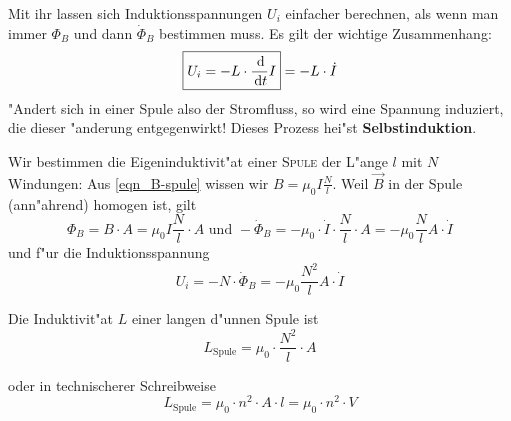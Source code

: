 Mit ihr lassen sich Induktionsspannungen $U_i$ einfacher berechnen,
als wenn man immer $\Phi_B$ und dann $\dot \Phi_B$ bestimmen muss. Es
gilt der wichtige Zusammenhang:
\begin{equation}
   \label{eq:336}
   \boxed{ U_i = -  L \cdot \frac{\, \mathrm{d} }{\, \mathrm{d} t} I } = - L \cdot
   \dot I
\end{equation}
"Andert sich in einer Spule also der Stromfluss, so wird eine Spannung
induziert, die dieser "anderung entgegenwirkt! Dieses Prozess hei"st
\textbf{Selbstinduktion}.

\bigskip
Wir bestimmen die Eigeninduktivit"at einer \textsc{Spule} der L"ange $l$
mit $N$ Windungen: Aus
\eqref{eqn_B-spule} wissen wir $B = \mu_0 I \frac{N}{l}$. Weil $\vec
B$ in der Spule (ann"ahrend) homogen ist, gilt
\begin{equation*}
   \label{eq:337}
   \Phi_B = B \cdot A = \mu_0 I \frac{N}{l} \cdot A \text{ und }
   -\dot\Phi_B = -\mu_0 \cdot \dot I \cdot \frac{N}{l} \cdot A = -\mu_0
   \frac{N}{l}A \cdot \dot I
\end{equation*}
und f"ur die Induktionsspannung
\begin{equation*}
\label{eq:338}
   U_i = -N \cdot \dot\Phi_B = -\mu_0
   \frac{N^2}{l}A \cdot \dot I
\end{equation*}
\begin{Wichtig}
   Die Induktivit"at $L$ einer langen d"unnen Spule ist
   \begin{equation}
      \label{eqn_induktivitaet_lange_Spule}
      L_{\text{Spule}} = \mu_0 \cdot \frac{N^2}{l}\cdot A
   \end{equation}
\end{Wichtig}
oder in technischerer Schreibweise
\begin{equation*}
   L_\text{Spule} = \mu_0 \cdot n^2 \cdot A \cdot l = \mu_0 \cdot n^2
   \cdot V
\end{equation*}



